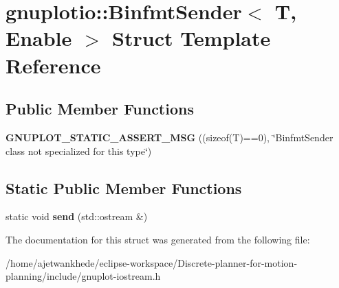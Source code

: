 \hypertarget{structgnuplotio_1_1BinfmtSender}{}\section{gnuplotio\+:\+:Binfmt\+Sender$<$ T, Enable $>$ Struct Template Reference}
\label{structgnuplotio_1_1BinfmtSender}
\subsection*{Public Member Functions}
\begin{DoxyCompactItemize}
\item 
\mbox{\label{structgnuplotio_1_1BinfmtSender_a02d7d348067625dc099e27249c24780a}} 
{\bfseries G\+N\+U\+P\+L\+O\+T\+\_\+\+S\+T\+A\+T\+I\+C\+\_\+\+A\+S\+S\+E\+R\+T\+\_\+\+M\+SG} ((sizeof(T)==0), \char`\"{}Binfmt\+Sender class not specialized for this type\char`\"{})
\end{DoxyCompactItemize}
\subsection*{Static Public Member Functions}
\begin{DoxyCompactItemize}
\item 
\mbox{\label{structgnuplotio_1_1BinfmtSender_a762010e3172c02e981252f93185b29c8}} 
static void {\bfseries send} (std\+::ostream \&)
\end{DoxyCompactItemize}


The documentation for this struct was generated from the following file\+:\begin{DoxyCompactItemize}
\item 
/home/ajetwankhede/eclipse-\/workspace/\+Discrete-\/planner-\/for-\/motion-\/planning/include/gnuplot-\/iostream.\+h\end{DoxyCompactItemize}

